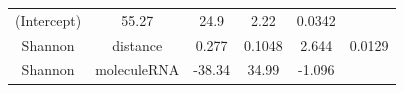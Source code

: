 \documentclass[]{article}
\begin{document}
\begin{longtable}[]{@{}cccccc@{}}
\begin{minipage}[t]{0.24\columnwidth}
(Intercept)\strut
\end{minipage} & \begin{minipage}[t]{0.11\columnwidth}\centering\strut
55.27\strut
\end{minipage} & \begin{minipage}[t]{0.14\columnwidth}\centering\strut
24.9\strut
\end{minipage} & \begin{minipage}[t]{0.12\columnwidth}\centering\strut
2.22\strut
\end{minipage} & \begin{minipage}[t]{0.09\columnwidth}\centering\strut
0.0342\strut
\end{minipage}\tabularnewline
\begin{minipage}[t]{0.12\columnwidth}\centering\strut
Shannon\strut
\end{minipage} & \begin{minipage}[t]{0.24\columnwidth}\centering\strut
distance\strut
\end{minipage} & \begin{minipage}[t]{0.11\columnwidth}\centering\strut
0.277\strut
\end{minipage} & \begin{minipage}[t]{0.14\columnwidth}\centering\strut
0.1048\strut
\end{minipage} & \begin{minipage}[t]{0.12\columnwidth}\centering\strut
2.644\strut
\end{minipage} & \begin{minipage}[t]{0.09\columnwidth}\centering\strut
0.0129\strut
\end{minipage}\tabularnewline
\begin{minipage}[t]{0.12\columnwidth}\centering\strut
Shannon\strut
\end{minipage} & \begin{minipage}[t]{0.24\columnwidth}\centering\strut
moleculeRNA\strut
\end{minipage} & \begin{minipage}[t]{0.11\columnwidth}\centering\strut
-38.34\strut
\end{minipage} & \begin{minipage}[t]{0.14\columnwidth}\centering\strut
34.99\strut
\end{minipage} & \begin{minipage}[t]{0.12\columnwidth}\centering\strut
-1.096\strut
\end{minipage} & \begin{minipage}[t]{0.09\columnwidth}\centering\strut

\end{minipage}
\end{longtable}
\end{document}
